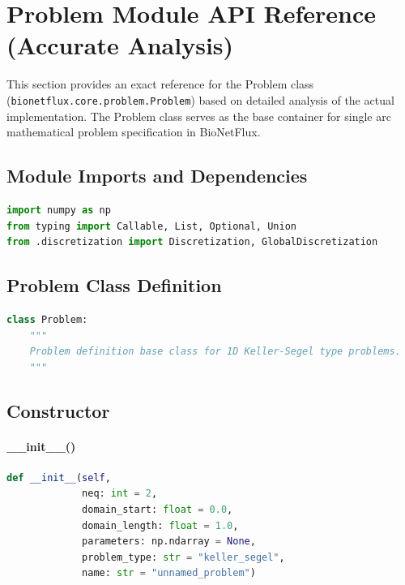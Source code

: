 %

\section{Problem Module API Reference (Accurate Analysis)}
\label{sec:problem_module_api_accurate}

This section provides an exact reference for the Problem class (\texttt{bionetflux.core.problem.Problem}) based on detailed analysis of the actual implementation. The Problem class serves as the base container for single arc mathematical problem specification in BioNetFlux.

\subsection{Module Imports and Dependencies}

\begin{lstlisting}[language=Python, caption=Module Dependencies]
import numpy as np
from typing import Callable, List, Optional, Union
from .discretization import Discretization, GlobalDiscretization
\end{lstlisting}

\subsection{Problem Class Definition}
\label{subsec:problem_class_definition}

\begin{lstlisting}[language=Python, caption=Class Declaration]
class Problem:
    """
    Problem definition base class for 1D Keller-Segel type problems.
    """
\end{lstlisting}

\subsection{Constructor}
\label{subsec:constructor}

\paragraph{\_\_init\_\_()}\leavevmode
\begin{lstlisting}[language=Python, caption=Problem Constructor]
def __init__(self, 
             neq: int = 2,
             domain_start: float = 0.0,
             domain_length: float = 1.0,
             parameters: np.ndarray = None,
             problem_type: str = "keller_segel",
             name: str = "unnamed_problem")
\end{lstlisting}

